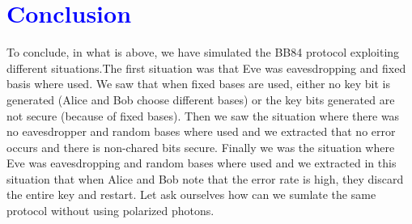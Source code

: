 \documentclass[a4paper,12pt]{article}
\begin{document}
\section*{\textcolor{blue}{Conclusion}}
To conclude, in what is above, we have simulated the BB84 protocol exploiting different situations.The first situation was that Eve was eavesdropping and fixed basis where used. We saw that when fixed bases are used, either no key bit is generated (Alice and Bob choose different bases) or the key bits generated are not secure (because of fixed bases). Then we saw the situation where there was no eavesdropper and random bases where used and we extracted that no error occurs and there is non-chared bits secure. Finally we was the situation where Eve was eavesdropping and random bases where used and we extracted  in this situation that when Alice and Bob note that the error rate is high, they discard the entire key and restart. Let ask ourselves how can we sumlate the same protocol without using polarized photons.
\end{document}
